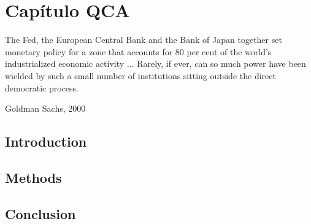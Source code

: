 \documentclass[12pt,openright,oneside,a4paper,english,sumario=tradicional]{gpsabntex}
\numberwithin{listing}{chapter}
\begin{document}
\tableofcontents*
\thispagestyle{empty}

\mainmatter
\cleardoublepage
\pagestyle{plain} %
\renewcommand{\thepage}{\arabic{page}}  %


\thispagestyle{empty} %

\chapter{Capítulo QCA}
\label{sec:orgf66981f}

\epigraph{The Fed, the European Central Bank and the Bank of Japan together set monetary policy for a zone that accounts for 80 per cent of the world’s
industrialized economic activity ... Rarely, if ever, can so much power have been wielded by such a small number of institutions sitting outside the
direct democratic process.}{Goldman Sachs, 2000}


\section{Introduction}
\label{sec:org71eb4d2}

\section{Methods}
\label{sec:orged7bf31}

\section{Conclusion}
\label{sec:org5dde19c}
\appendix
\end{document}
